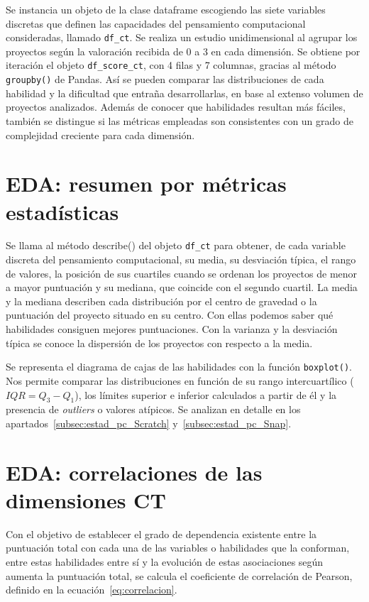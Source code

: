 \documentclass[a4paper, 12pt]{book}
\begin{document}
Se instancia un objeto de la clase dataframe escogiendo las siete variables discretas que definen las capacidades del pensamiento computacional consideradas, llamado \texttt{df\_ct}. Se realiza un estudio unidimensional al agrupar los proyectos según la valoración recibida de 0 a 3 en cada dimensión. Se obtiene por iteración el objeto \texttt{df\_score\_ct}, con 4 filas y 7 columnas, gracias al método \texttt{groupby()} de Pandas. Así se pueden comparar las distribuciones de cada habilidad y la dificultad que entraña desarrollarlas, en base al extenso volumen de proyectos analizados. Además de conocer que habilidades resultan más fáciles, también se distingue si las métricas empleadas son consistentes con un grado de complejidad creciente para cada dimensión.

\section{EDA: resumen por métricas estadísticas} 
\label{sec:EDA_estadísticos}

Se llama al método describe() del objeto \texttt{df\_ct} para obtener, de cada variable discreta del pensamiento computacional, su media, su desviación típica, el rango de valores, la posición de sus cuartiles cuando se ordenan los proyectos de menor a mayor puntuación y su mediana, que coincide con el segundo cuartil. La media y la mediana describen cada distribución por el centro de gravedad o la puntuación del proyecto situado en su centro. Con ellas podemos saber qué habilidades consiguen mejores puntuaciones. Con la varianza y la desviación típica se conoce la dispersión de los proyectos con respecto a la media. 

Se representa el diagrama de cajas de las habilidades con la función \texttt{boxplot()}. Nos permite comparar las distribuciones en función de su rango intercuartílico ($IQR=Q_3 - Q_1$), los límites superior e inferior calculados a partir de él y la presencia de \emph{outliers} o valores atípicos. Se analizan en detalle en los apartados~\ref{subsec:estad_pc_Scratch} y~\ref{subsec:estad_pc_Snap}.   

\section{EDA: correlaciones de las dimensiones CT} 
\label{sec:EDA_corr}

Con el objetivo de establecer el grado de dependencia existente entre la puntuación total con cada una de las variables o habilidades que la conforman, entre estas habilidades entre sí y la evolución de estas asociaciones según aumenta la puntuación total, se calcula el coeficiente de correlación de Pearson, definido en la ecuación~\ref{eq:correlacion}. 
\end{document}

